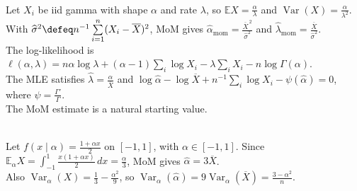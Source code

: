 \begin{example} \label{ex:gamma-moments-and-likelihood-equations} \\
Let $X_i$ be iid gamma with shape $\alpha$ and rate $\lambda$, so $\mathbb{E}X=\frac{\alpha}{\lambda}$ and $\operatorname{Var}(X)=\frac{\alpha}{\lambda^2}$.\\
With $\widehat{\sigma}^2\defeq n^{-1}\sum\limits_{i=1}^{n}(X_i-\overline{X})^2$, MoM gives $\widehat{\alpha}_{\mathrm{mom}}=\frac{\overline{X}^{\,2}}{\widehat{\sigma}^2}$ and $\widehat{\lambda}_{\mathrm{mom}}=\frac{\overline{X}}{\widehat{\sigma}^2}$.\\
The log-likelihood is $\ell(\alpha,\lambda)=n\alpha\log\lambda+(\alpha-1)\sum\limits_i\log X_i-\lambda\sum\limits_iX_i-n\log\Gamma(\alpha)$.\\
The MLE satisfies $\widehat{\lambda}=\frac{\widehat{\alpha}}{\overline{X}}$ and $\log\widehat{\alpha}-\log\overline{X}+n^{-1}\sum\limits_i\log X_i-\psi(\widehat{\alpha})=0$, where $\psi=\frac{\Gamma'}{\Gamma}$.\\
The MoM estimate is a natural starting value.
\end{example}

\begin{example} \label{ex:angular-distribution-method-of-moments} \\
Let $f(x\mid\alpha)=\frac{1+\alpha x}{2}$ on $[-1,1]$, with $\alpha\in[-1,1]$. Since $\mathbb{E}_\alpha X=\int_{-1}^{1}\frac{x(1+\alpha x)}{2}\,dx=\frac{\alpha}{3}$, MoM gives $\widehat{\alpha}=3\overline{X}$.\\
Also $\operatorname{Var}_\alpha(X)=\frac{1}{3}-\frac{\alpha^2}{9}$, so $\operatorname{Var}_\alpha(\widehat{\alpha})=9\operatorname{Var}_\alpha(\overline{X})=\frac{3-\alpha^2}{n}$.
\end{example}
